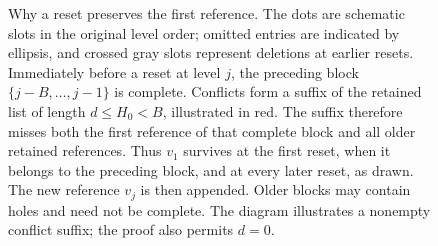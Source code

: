 \begin{figure}[t]
\caption{Why a reset preserves the first reference. The dots are schematic
slots in the original level order; omitted entries are indicated by
ellipsis, and crossed gray slots represent deletions at earlier resets.
Immediately before a reset at level $j$, the preceding block
$\{j-B,\ldots,j-1\}$ is complete. Conflicts form a suffix of the retained
list of length $d\le H_0<B$, illustrated in red. The suffix therefore
misses both the first reference of that complete block and all older
retained references. Thus $v_1$ survives at the first reset, when it
belongs to the preceding block, and at every later reset, as drawn.
The new reference $v_j$ is then appended.
Older blocks may contain holes and need not be complete. The diagram
illustrates a nonempty conflict suffix; the proof also permits $d=0$.}
\label{fig:protected-block}
\end{figure}
